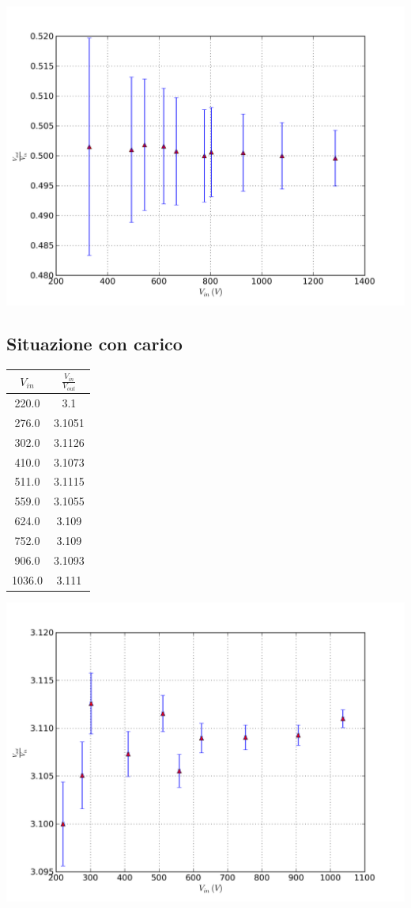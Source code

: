\includegraphics[scale=0.75]{grafici/C1/part11.png}

\subsection{Situazione con carico}
\begin{center}

\begin{tabular}{*{2}{c}}
$V_{in}$ & $\frac{V_{in}}{V_{out}}$\\
\midrule
220.0 & 3.1 \\
276.0 & 3.1051 \\
302.0 & 3.1126 \\
410.0 & 3.1073 \\
511.0 & 3.1115 \\
559.0 & 3.1055 \\
624.0 & 3.109 \\
752.0 & 3.109 \\
906.0 & 3.1093 \\
1036.0 & 3.111 \\
\end{tabular}

\end{center}
\includegraphics[scale=0.75]{grafici/C1/part22.png}


